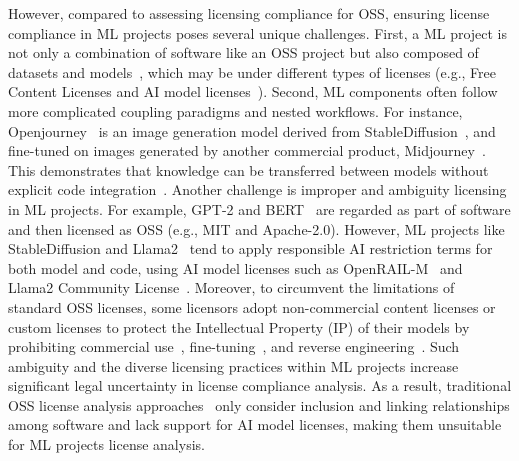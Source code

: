 However, compared to assessing licensing compliance for OSS, ensuring license compliance in ML projects poses several unique challenges. 
First, a ML project is not only a combination of software like an OSS project but also composed of datasets and models~\cite{han2021pre}, which may be under different types of licenses (e.g., Free Content Licenses and AI model licenses~\cite{contractor2022behavioral}).
Second, ML components often follow more complicated coupling paradigms and nested workflows. For instance, Openjourney~\cite{openjourney2023prompthero} is an image generation model derived from StableDiffusion~\cite{rombach2022high}, and fine-tuned on images generated by another commercial product, Midjourney~\cite{midjourney2023terms}.
This demonstrates that knowledge can be transferred between models without explicit code integration~\cite{you2021workshop}.
Another challenge is improper and ambiguity licensing in ML projects.
For example, GPT-2 and BERT~\cite{devlin2019bert} are regarded as part of software and then licensed as OSS (e.g., MIT and Apache-2.0).
However, ML projects like StableDiffusion and Llama2~\cite{touvron2023llama} tend to apply responsible AI restriction terms for both model and code, using AI model licenses such as OpenRAIL-M~\cite{contractor2022behavioral} and Llama2 Community License~\cite{meta2023llama2}.
Moreover, to circumvent the limitations of standard OSS licenses, some licensors adopt non-commercial content licenses or custom licenses to protect the Intellectual Property (IP) of their models by prohibiting commercial use~\cite{huang2022layoutlmv3}, fine-tuning~\cite{dreamlike2023}, and reverse engineering~\cite{goyal2022vision}.
Such ambiguity and the diverse licensing practices within ML projects  increase significant legal uncertainty in license compliance analysis.
As a result, traditional OSS license analysis approaches~\cite{ombredanne2020free, mathur2012empirical} only consider inclusion and linking relationships among software and lack support for AI model licenses, making them unsuitable for ML projects license analysis.

